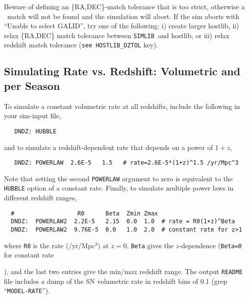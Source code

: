 \documentclass[12pt]{article}
\newcommand{\simlib}{{\tt SIMLIB}}
\newcommand{\hostlib}{{\sc hostlib}}
\begin{document}
{Beware of defining an \{RA,DEC\}-match tolerance that is too strict, 
otherwise a \groupid\  match will not be found and the 
simulation will abort. If the sim aborts with ``Unable to select GALID'',
try one of the following: 
i) create larger \hostlib,
ii) relax \{RA,DEC\} match tolerance between \simlib\ and \hostlib, or
iii) relax redshift match tolerance ({\tt see HOSTLIB\_DZTOL} key).


   \clearpage
 \subsection{Simulating Rate vs. Redshift: Volumetric and per Season}
 \label{subsec:DNDZ}

To simulate a constant volumetric rate at all redshifts,
include the following in your sim-input file,
%
\begin{verbatim}
   DNDZ: HUBBLE
\end{verbatim}
%
and to simulate a redshift-dependent rate that depends
on a power of $1+z$,
%
\begin{verbatim}
   DNDZ: POWERLAW  2.6E-5   1.5   # rate=2.6E-5*(1+z)^1.5 /yr/Mpc^3
\end{verbatim}
%
Note that setting the second {\tt POWERLAW} argument to zero
is equivalent to the {\tt HUBBLE} option of a constant rate.
Finally, to simulate multiple power laws in different 
redshift ranges,
\begin{verbatim}
  #                  R0      Beta  Zmin Zmax
  DNDZ:  POWERLAW2  2.2E-5   2.15  0.0  1.0  # rate = R0(1+z)^Beta
  DNDZ:  POWERLAW2  9.76E-5  0.0   1.0  2.0  # constant rate for z>1
\end{verbatim}
%
where {\tt R0} is the rate (/yr/Mpc$^3$) at $z=0$,
{\tt Beta} gives the $z$-dependence ({\tt Beta=0} for constant rate}),
and the last two entries give the min/max redshift range.
The output {\tt README} file includes a dump of the 
SN volumetric rate in redshift bins of 0.1
(grep ``{\tt MODEL-RATE}'').
\end{document}
